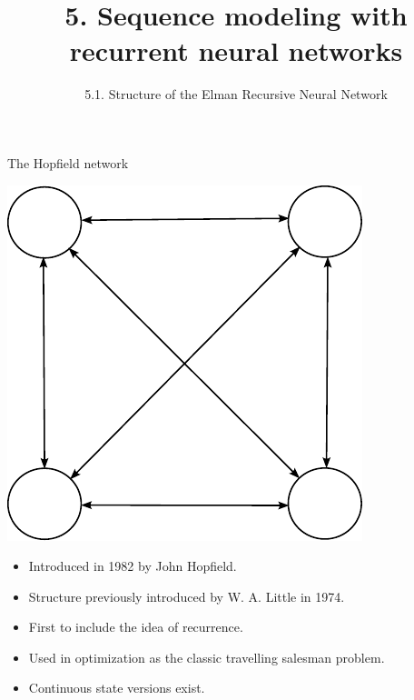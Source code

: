 \documentclass{beamer}
\title{5. Sequence modeling with recurrent neural networks}
\subtitle{5.1. Structure of the Elman Recursive Neural Network}
\begin{document}
\maketitle
\begin{frame}{The Hopfield network}
\begin{multicols}{2}
\begin{center}
    \includegraphics[scale=0.8]{Module 5 (RNN)/pics/hopfield.pdf}
\end{center}

\columnbreak

\begin{itemize}
    \item Introduced in 1982 by John Hopfield. 
    \item Structure previously introduced by W. A. Little in 1974.
    \item First to include the idea of recurrence. 
    \item Used in optimization as the classic travelling salesman problem. 
    \item Continuous state versions exist.
\end{itemize}

\end{multicols}

\end{frame}
\end{document}
